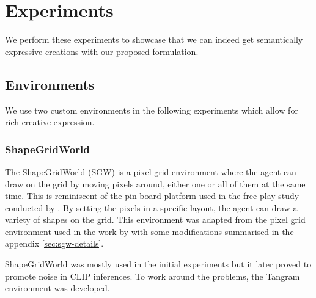 \chapter{Experiments}
\label{sec:experiments}

We perform these experiments to showcase that we can indeed get semantically expressive creations with our proposed formulation.

\section{Environments}

We use two custom environments in the following experiments which allow for rich creative expression.

\subsection{ShapeGridWorld}
\label{sec:sgw}
The ShapeGridWorld (SGW) is a pixel grid environment where the agent can draw on the grid by moving pixels around, either one or all of them at the same time.
This is reminiscent of the pin-board platform used in the free play study conducted by \citet{diggs}.
By setting the pixels in a specific layout, the agent can draw a variety of shapes on the grid.
This environment was adapted from the pixel grid environment used in the work by \citet{rair} with some modifications summarised in the appendix \ref{sec:sgw-details}.


ShapeGridWorld was mostly used in the initial experiments but it later proved to promote noise in CLIP inferences.
To work around the problems, the Tangram environment was developed.

